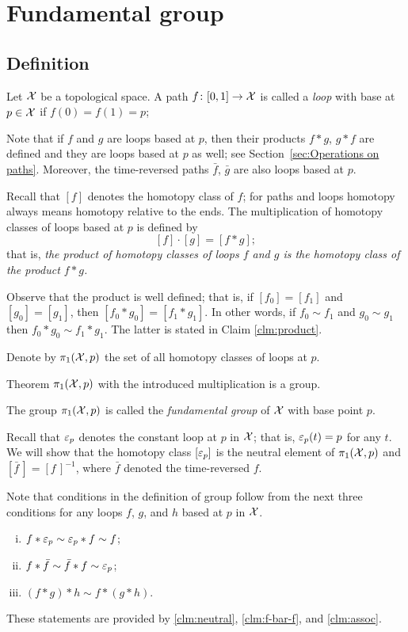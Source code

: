 \chapter{Fundamental group}

\section{Definition}

Let $\mathcal{X}$ be a topological space.
A path $f\colon[0,1]\to\mathcal{X}$ is called a \emph{loop} with base at $p\in\mathcal{X}$ if $f(0)=f(1)=p$;


Note that if $f$ and $g$ are loops based at $p$, then their products $f*g$, $g*f$ are defined and they are loops based at $p$ as well; see Section~\ref{sec:Operations on paths}.
Moreover, the time-reversed paths $\bar f$, $\bar g$ are also loops based at $p$.


Recall that $[f]$ denotes the homotopy class of $f$; for paths and loops homotopy always means homotopy relative to the ends. 
The multiplication of homotopy classes of loops based at $p$ is defined by 
\[[f]\cdot [g]=[f*g];\]
that is, \textit{the product of homotopy classes of loops $f$ and $g$ is the homotopy class of the product $f*g$.}

Observe that the product is well defined;
that is, if $[f_0]= [f_1]$ and $[g_0]=[g_1]$, then  $[f_0*g_0]=[f_1*g_1]$.
In other words, if $f_0\sim f_1$ and $g_0\sim g_1$ then $f_0*g_0\sim f_1*g_1$.
The latter is stated in Claim \ref{clm:product}.

Denote by $\pi_1(\mathcal{X},p)$ the set of all homotopy classes of loops at $p$.

\begin{thm}{Theorem}
 $\pi_1(\mathcal{X},p)$ with the introduced multiplication is a group.
\end{thm}

The group $\pi_1(\mathcal{X},p)$ is called the \emph{fundamental group} of $\mathcal{X}$ with base point $p$.

Recall that $\varepsilon_p$ denotes the constant loop at $p$ in $\mathcal{X}$;
that is, $\varepsilon_p(t)=p$ for any $t$.
We will show that the homotopy class $[\varepsilon_p]$ is the neutral element of $\pi_1(\mathcal{X},p)$
and $[\bar f\,]=[f\,]^{-1}$, where $\bar f$ denoted the time-reversed $f$.

Note that conditions in the definition of group follow from the next three conditions for any loops $f$, $g$, and $h$ based at $p$ in $\mathcal{X}$.
\begin{enumerate}[(i)]
\item $f*\varepsilon_p\sim \varepsilon_p*f\sim f$;
\item $f*\bar f\sim\bar f* f\sim \varepsilon_p$;
\item $(f*g)*h\sim f*(g*h)$.
\end{enumerate}
These statements are provided by \ref{clm:neutral}, \ref{clm:f-bar-f}, and \ref{clm:assoc}.
\qeds

